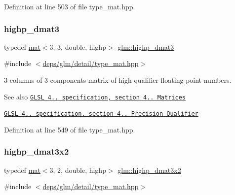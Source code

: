 Definition at line 503 of file type\+\_\+mat.\+hpp.

\mbox{\label{group__core__precision_ga2e305d56d01a4553a7fd2b6d2c580fa0}} 
\subsubsection{\texorpdfstring{highp\+\_\+dmat3}{highp\_dmat3}}
{\footnotesize\ttfamily typedef \hyperlink{structglm_1_1mat}{mat}$<$3, 3, double, highp$>$ \hyperlink{group__core__precision_ga2e305d56d01a4553a7fd2b6d2c580fa0}{glm\+::highp\+\_\+dmat3}}



{\ttfamily \#include $<$\hyperlink{type__mat_8hpp}{deps/glm/detail/type\+\_\+mat.\+hpp}$>$}

3 columns of 3 components matrix of high qualifier floating-\/point numbers.

\begin{DoxySeeAlso}{See also}
\href{http://www.opengl.org/registry/doc/GLSLangSpec.4.20.8.pdf}{\tt G\+L\+SL 4.. specification, section 4.. Matrices} 

\href{http://www.opengl.org/registry/doc/GLSLangSpec.4.20.8.pdf}{\tt G\+L\+SL 4.. specification, section 4.. Precision Qualifier} 
\end{DoxySeeAlso}


Definition at line 549 of file type\+\_\+mat.\+hpp.

\mbox{\label{group__core__precision_ga8454b92a3917b17a8663f2409cb3100d}} 
\subsubsection{\texorpdfstring{highp\+\_\+dmat3x2}{highp\_dmat3x2}}
{\footnotesize\ttfamily typedef \hyperlink{structglm_1_1mat}{mat}$<$3, 2, double, highp$>$ \hyperlink{group__core__precision_ga8454b92a3917b17a8663f2409cb3100d}{glm\+::highp\+\_\+dmat3x2}}



{\ttfamily \#include $<$\hyperlink{type__mat_8hpp}{deps/glm/detail/type\+\_\+mat.\+hpp}$>$}

